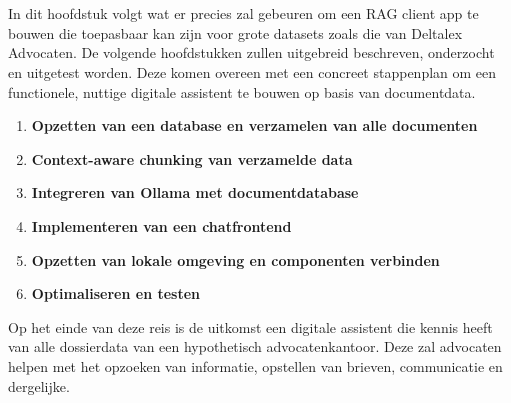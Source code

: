
\chapter{}%
\label{ch:methodologie}


In dit hoofdstuk volgt wat er precies zal gebeuren om een RAG client app te bouwen die toepasbaar kan zijn voor grote datasets zoals die van Deltalex Advocaten. 
De volgende hoofdstukken zullen uitgebreid beschreven, onderzocht en uitgetest worden. 
Deze komen overeen met een concreet stappenplan om een functionele, nuttige digitale assistent te bouwen op basis van documentdata. 

\begin{enumerate}
    \item \textbf{Opzetten van een database en verzamelen van alle documenten}
    \item \textbf{Context-aware chunking van verzamelde data}
    \item \textbf{Integreren van Ollama met documentdatabase}
    \item \textbf{Implementeren van een chatfrontend}
    \item \textbf{Opzetten van lokale omgeving en componenten verbinden}
    \item \textbf{Optimaliseren en testen}
\end{enumerate} 

Op het einde van deze reis is de uitkomst een digitale assistent die kennis heeft van alle dossierdata van een hypothetisch advocatenkantoor. 
Deze zal advocaten helpen met het opzoeken van informatie, opstellen van brieven, communicatie en dergelijke. 


